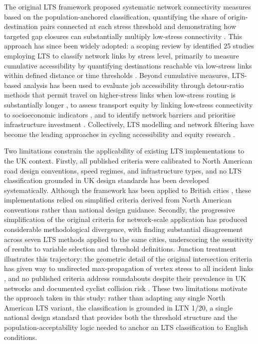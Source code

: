 The original LTS framework proposed systematic network connectivity measures based on the population-anchored classification, quantifying the share of origin-destination pairs connected at each stress threshold and demonstrating how targeted gap closures can substantially multiply low-stress connectivity \parencite{mekuria2012a,furth2016}. This approach has since been widely adopted: a scoping review by \textcite{schon2024} identified 25 studies employing LTS to classify network links by stress level, primarily to measure cumulative accessibility by quantifying destinations reachable via low-stress links within defined distance or time thresholds \parencite{murphy2019,wasserman2019,gehrke2025}. Beyond cumulative measures, LTS-based analysis has been used to evaluate job accessibility through detour-ratio methods that permit travel on higher-stress links when low-stress routing is substantially longer \parencite{furth2016,lowry2017,cabral2019}, to assess transport equity by linking low-stress connectivity to socioeconomic indicators \parencite{tucker2018,kent2019}, and to identify network barriers and prioritise infrastructure investment \parencite{lowry2017,putta2019}. Collectively, LTS modelling and network filtering have become the leading approaches in cycling accessibility and equity research \parencite{louro2026}.

Two limitations constrain the applicability of existing LTS implementations to the UK context. Firstly, all published criteria were calibrated to North American road design conventions, speed regimes, and infrastructure types, and no LTS classification grounded in UK design standards has been developed systematically. Although the framework has been applied to British cities \parencite{cervero2019,jeong2025}, these implementations relied on simplified criteria derived from North American conventions rather than national design guidance. Secondly, the progressive simplification of the original criteria for network-scale application has produced considerable methodological divergence, with \textcite{harvey2024} finding substantial disagreement across seven LTS methods applied to the same cities, underscoring the sensitivity of results to variable selection and threshold definitions. Junction treatment illustrates this trajectory: the geometric detail of the original intersection criteria has given way to undirected max-propagation of vertex stress to all incident links \parencite{conveyal2015}, and no published criteria address roundabouts despite their prevalence in UK networks and documented cyclist collision risk \parencite{daniels2009,aldred2021}. These two limitations motivate the approach taken in this study: rather than adapting any single North American LTS variant, the classification is grounded in LTN 1/20, a single national design standard that provides both the threshold structure and the population-acceptability logic needed to anchor an LTS classification to English conditions.


